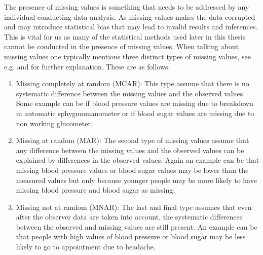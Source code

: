 \documentclass[../thesis.tex]{subfiles}
\begin{document}
\noindent The presence of missing values is something that needs to be addressed by any individual conducting data analysis. As missing values makes the data corrupted and may introduce statistical bias that may lead to invalid results and inferences. This is vital for us as many of the statistical methods used later in this thesis cannot be conducted in the presence of missing values. When talking about missing values one typically mentions three distinct types of missing values, see e.g. \cite{sterne2009multiple} and \cite{kaushal2014missing} for further explanation. These are as follows:

\newpage

\begin{enumerate}[label=(\roman*)]
    \item Missing completely at random (MCAR): This type assume that there is no systematic difference between the missing values and the observed values. Some example can be if blood pressure values are missing due to breakdown in automatic sphygmomanometer or if blood sugar values are missing due to non working glucometer.
    \item Missing at random (MAR): The second type of missing values assume that any difference between the missing values and the observed values can be explained by differences in the observed values. Again an example can be that missing blood pressure values or blood sugar values may be lower than the measured values but only because younger people may be more likely to have missing blood pressure and blood sugar as missing.
    \item Missing not at random (MNAR): The last and final type assumes that even after the observer data are taken into account, the systematic differences between the observed and missing values are still present. An example can be that people with high values of blood pressure or blood sugar may be less likely to go to appointment due to headache.  
\end{enumerate}
\end{document}
